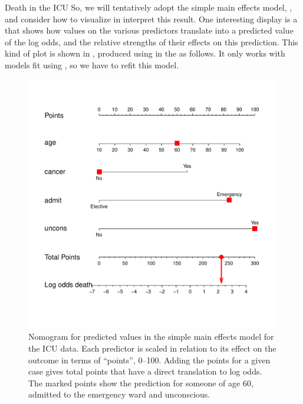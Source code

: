 \documentclass[11pt]{book}
\renewenvironment{knitrout}{\small\renewcommand{\baselinestretch}{.85}}{} %
\begin{document}
\begin{Example}[icu1]{Death in the ICU}
So, we will tentatively adopt the simple main effects model, ,
and consider how to visualize in interpret this result.
One interesting display is a  that shows how values on the various
predictors translate into a predicted value of the log odds, and the relative
strengths of their effects on this prediction.  This kind of plot is shown in
, produced using  in the 
as follows.  It only works with models fit using , so we have to
refit this model.

\begin{knitrout}
\color{fgcolor}\begin{kframe}
\begin{alltt}
 \hlkwb{<-}  \hlopt{~}  \hlopt{+}   \hlopt{+}  \hlopt{+}  
\hlstd{(} \hlstd{=}\hlstd{,} \hlstd{=}\hlstd{)}
\end{alltt}
\end{kframe}
\end{knitrout}


\begin{figure}[!htb]
 \centering
 \includegraphics[width=.7\textwidth]{ch07/fig/icu-nomogram}
 \caption{Nomogram for predicted values in the simple main effects model for the ICU data.  Each predictor is scaled in relation to its effect on the outcome in terms of ``points'', 0--100.  Adding the points for a given case gives total points that have a direct translation to log odds.  The marked points show the prediction for someone of age 60, admitted to the emergency ward and unconscious. }
 \label{fig:icu-nomogram}
\end{figure}


\end{Example}
\end{document}
